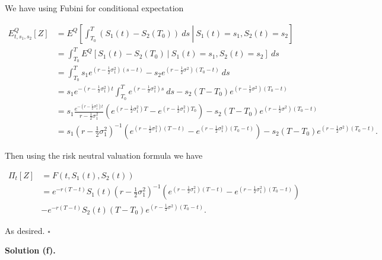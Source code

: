 \documentclass[
]{book}
\begin{document}
We have using Fubini for conditional expectation

\begin{align*}
E^Q_{t,s_1,s_2}\left[Z\right]&=E^Q\left[\left.\int_{T_0}^T(S_1(t)-S_2(T_0))\ ds \ \right\vert\ S_1(t)=s_1,S_2(t)=s_2\right]\\
&=\int_{T_0}^TE^Q\left[\left.S_1(t)-S_2(T_0) \ \right\vert\ S_1(t)=s_1,S_2(t)=s_2\right]\ ds\\
&=\int_{T_0}^T s_1e^{\left(r-\frac{1}{2}\sigma_1^2\right)(s-t)} -s_2e^{\left(r-\frac{1}{2}\sigma^2\right)(T_0-t)} \ ds\\
&=s_1e^{-\left(r-\frac{1}{2}\sigma_1^2\right)t}\int_{T_0}^T e^{\left(r-\frac{1}{2}\sigma_1^2\right)s}\ ds-s_2(T-T_0)e^{\left(r-\frac{1}{2}\sigma^2\right)(T_0-t)}\\
&=s_1\frac{e^{-\left(r-\frac{1}{2}\sigma_1^2\right)t}}{r-\frac{1}{2}\sigma_1^2}\left( e^{\left(r-\frac{1}{2}\sigma_1^2\right)T}- e^{\left(r-\frac{1}{2}\sigma_1^2\right)T_0}\right)-s_2(T-T_0)e^{\left(r-\frac{1}{2}\sigma^2\right)(T_0-t)}\\
&=s_1\left(r-\frac{1}{2}\sigma_1^2\right)^{-1}\left( e^{\left(r-\frac{1}{2}\sigma_1^2\right)(T-t)}- e^{\left(r-\frac{1}{2}\sigma_1^2\right)(T_0-t)}\right)-s_2(T-T_0)e^{\left(r-\frac{1}{2}\sigma^2\right)(T_0-t)}.
\end{align*}

Then using the risk neutral valuation formula we have

\begin{align*}
\Pi_t[Z]&=F(t,S_1(t),S_2(t))\\
&=e^{-r(T-t)}S_1(t)\left(r-\frac{1}{2}\sigma_1^2\right)^{-1}\left( e^{\left(r-\frac{1}{2}\sigma_1^2\right)(T-t)}- e^{\left(r-\frac{1}{2}\sigma_1^2\right)(T_0-t)}\right)\\
&-e^{-r(T-t)}S_2(t)(T-T_0)e^{\left(r-\frac{1}{2}\sigma^2\right)(T_0-t)}.
\end{align*}

As desired. \(\square\)

\noindent\makebox[\linewidth]{\rule{\textwidth}{0.4pt}}

\textbf{Solution (f).}
\end{document}
